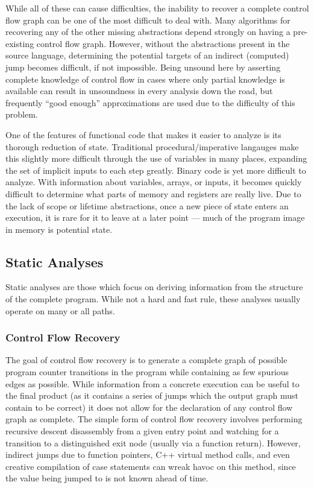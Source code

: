 While all of these can cause difficulties, the inability to recover a complete control flow graph can be one of the most difficult to deal with.
Many algorithms for recovering any of the other missing abstractions depend strongly on having a pre-existing control flow graph\cite{vsa,bddbddb,smash,tie,bitr,wrappedintervals,ramalingam2000}.
However, without the abstractions present in the source language, determining the potential targets of an indirect (computed) jump becomes difficult, if not impossible.
Being unsound here by asserting complete knowledge of control flow in cases where only partial knowledge is available can result in unsoundness in every analysis down the road, but frequently ``good enough'' approximations are used due to the difficulty of this problem.

One of the features of functional code that makes it easier to analyze is its thorough reduction of state.
Traditional procedural/imperative langauges make this slightly more difficult through the use of variables in many places, expanding the set of implicit inputs to each step greatly.
Binary code is yet more difficult to analyze.
With information about variables, arrays, or inputs, it becomes quickly difficult to determine what parts of memory and registers are really live.
Due to the lack of scope or lifetime abstractions, once a new piece of state enters an execution, it is rare for it to leave at a later point --- much of the program image in memory is potential state.

\subsection{Static Analyses}
Static analyses are those which focus on deriving information from the structure of the complete program.
While not a hard and fast rule, these analyses usually operate on many or all paths.

\subsubsection{Control Flow Recovery}
\label{sec:cfg}
The goal of control flow recovery is to generate a complete graph of possible program counter transitions in the program while containing as few spurious edges as possible.
While information from a concrete execution can be useful to the final product (as it contains a series of jumps which the output graph must contain to be correct) it does not allow for the declaration of any control flow graph as complete.
The simple form of control flow recovery involves performing recursive descent disassembly from a given entry point and watching for a transition to a distinguished exit node (usually via a function return).
However, indirect jumps due to function pointers, C++ virtual method calls, and even creative compilation of case statements can wreak havoc on this method, since the value being jumped to is not known ahead of time.

